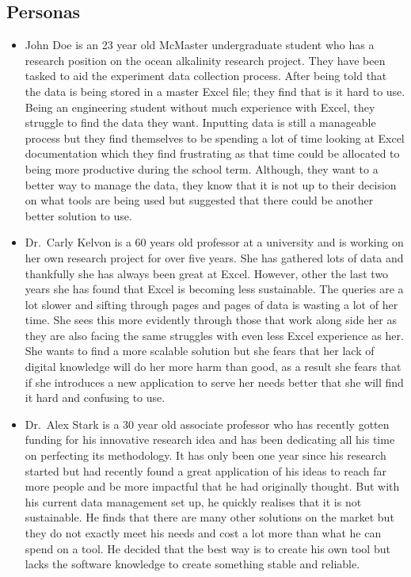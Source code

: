 \documentclass[12pt]{article}
\begin{document}
\subsection{Personas}
\begin{itemize}
  \item John Doe is an 23 year old McMaster undergraduate student who has a
  research position on the ocean alkalinity research project. They have been
  tasked to aid the experiment data collection process. After being told that
  the data is being stored in a master Excel file; they find that is it hard to
  use. Being an engineering student without much experience with Excel, they
  struggle to find the data they want. Inputting data is still a manageable
  process but they find themselves to be spending a lot of time looking at Excel
  documentation which they find frustrating as that time could be allocated to
  being more productive during the school term. Although, they want to a better
  way to manage the data, they know that it is not up to their decision on what
  tools are being used but suggested that there could be another better solution
  to use. 
  \item Dr.\ Carly Kelvon is a 60 years old professor at a university and
  is working on her own research project for over five years. She has gathered
  lots of data and thankfully she has always been great at Excel. However, other
  the last two years she has found that Excel is becoming less sustainable. The
  queries are a lot slower and sifting through pages and pages of data is
  wasting a lot of her time. She sees this more evidently through those that
  work along side her as they are also facing the same struggles with even less
  Excel experience as her. She wants to find a more scalable solution but she
  fears that her lack of digital knowledge will do her more harm than good, as a
  result she fears that if she introduces a new application to serve her needs
  better that she will find it hard and confusing to use. 
  \item Dr.\ Alex Stark is a 30 year old associate professor who has recently
  gotten funding for his innovative research idea and has been dedicating all
  his time on perfecting its methodology. It has only been one year since his
  research started but had recently found a great application of his ideas to
  reach far more people and be more impactful that he had originally thought.
  But with his current data management set up, he quickly realises that it is not
  sustainable. He finds that there are many other solutions on the market but
  they do not exactly meet his needs and cost a lot more than what he can spend
  on a tool. He decided that the best way is to create his own tool but lacks
  the software knowledge to create something stable and reliable. 
\end{itemize}
    
\end{document}
